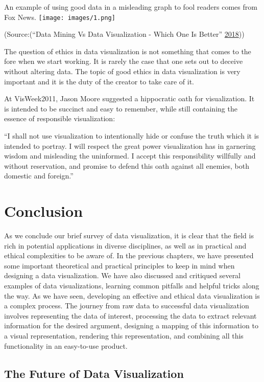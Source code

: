 \documentclass[]{book}
\begin{document}
An example of using good data in a misleading graph to fool readers comes from Fox News.
\texttt{[image: images/1.png]}

(Source:(``Data Mining Vs Data Visualization - Which One Is Better'' \protect\hyperlink{ref-datamining_vs_viz}{2018}))

The question of ethics in data visualization is not something that comes to the fore when we start working. It is rarely the case that one sets out to deceive without altering data. The topic of good ethics in data visualization is very important and it is the duty of the creator to take care of it.

At VisWeek2011, Jason Moore suggested a hippocratic oath for visualization. It is intended to be succinct and easy to remember, while still containing the essence of responsible visualization:

``I shall not use visualization to intentionally hide or confuse the truth which it is intended to portray. I will respect the great power visualization has in garnering wisdom and misleading the uninformed. I accept this responsibility willfully and without reservation, and promise to defend this oath against all enemies, both domestic and foreign.''

\hypertarget{conclusion}{%
\chapter{Conclusion}\label{conclusion}}

As we conclude our brief survey of data visualization, it is clear that the field is rich in potential applications in diverse disciplines, as well as in practical and ethical complexities to be aware of. In the previous chapters, we have presented some important theoretical and practical principles to keep in mind when designing a data visualization. We have also discussed and critiqued several examples of data visualizations, learning common pitfalls and helpful tricks along the way. As we have seen, developing an effective and ethical data visualization is a complex process. The journey from raw data to successful data visualization involves representing the data of interest, processing the data to extract relevant information for the desired argument, designing a mapping of this information to a visual representation, rendering this representation, and combining all this functionality in an easy-to-use product.

\hypertarget{the-future-of-data-visualization}{%
\section{The Future of Data Visualization}\label{the-future-of-data-visualization}}
\end{document}

